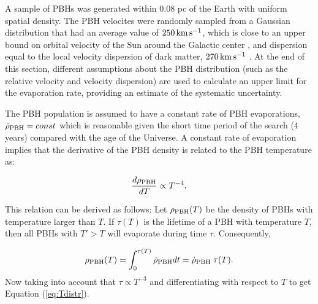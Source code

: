 A sample of PBHs was generated within 0.08 pc of the Earth with uniform spatial density.
The PBH velocites were randomly sampled from a Gaussian distribution that had an average value of $250\rm\,km\, s^{-1}$, which is close to an upper bound on orbital velocity of the Sun around the Galactic center \citep{1999MNRAS.310..645W, 2008ApJ...684.1143X, 2009PASJ...61..227S, 2010ApJ...720L.108G, 2010MNRAS.402..934M, 2011MNRAS.414.2446M},
and dispersion equal to the local velocity dispersion of dark matter, $270\rm\,km\, s^{-1}$ \citep{2010JCAP...02..030K}.
At the end of this section, different assumptions about the PBH distribution (such as the relative velocity and velocity dispersion) are used to calculate an upper limit for the evaporation rate, providing an estimate of the systematic uncertainty.

The PBH population is assumed to have a constant rate of PBH evaporations, $\dot{\rho}_{\rm PBH} = const$ which is reasonable given the short time period of the search (4 years) compared with the age of the Universe.
A constant rate of evaporation implies that the derivative of the PBH density is related to the PBH temperature as:

\noindent
\begin{equation}
\label{eq:Tdistr}
\frac{d \rho_{\rm PBH}}{d T} \propto T^{-4}.
\end{equation}

This relation can be derived as follows: Let $\rho_{\rm PBH}(T)$ be the density of PBHs with temperature larger than $T$. If $\tau(T)$ is the lifetime of a PBH with temperature $T$, then all PBHs with $T' > T$ will evaporate during time $\tau$. Consequently,

\noindent
\begin{equation}
\label{eq:rho0}
\rho_{\rm PBH}(T) = \int_0^{\tau(T)} \dot{\rho}_{\rm PBH} dt = \dot{\rho}_{\rm PBH}\; \tau(T).
\end{equation}
Now taking into account that $\tau \propto T^{-3}$ and differentiating with respect to $T$ to get
Equation (\ref{eq:Tdistr}).

